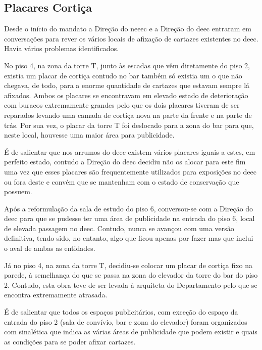 
\subsection{Placares Cortiça}

Desde o início do mandato a Direção do \acrshort{neeec} e a Direção do \acrshort{deec} entraram em conversações para rever os vários locais de afixação de cartazes existentes no \acrshort{deec}. Havia vários problemas identificados.

No piso 4, na zona da torre T, junto às escadas que vêm diretamente do piso 2, existia um placar de cortiça contudo no bar também só existia um o que não chegava, de todo, para a enorme quantidade de cartazes que estavam sempre lá afixados. Ambos os placares se encontravam em elevado estado de deterioração com buracos extremamente grandes pelo que os dois placares tiveram de ser reparados levando uma camada de cortiça nova na parte da frente e na parte de trás. Por sua vez, o placar da torre T foi deslocado para a zona do bar para que, neste local, houvesse uma maior área para publicidade.

É de salientar que nos arrumos do \acrshort{deec} existem vários placares iguais a estes, em perfeito estado, contudo a Direção do \acrshort{deec} decidiu não os alocar para este fim uma vez que esses placares são frequentemente utilizados para exposições no \acrshort{deec} ou fora deste e convém que se mantenham com o estado de conservação que possuem.

Após a reformulação da sala de estudo do piso 6, conversou-se com a Direção do \acrshort{deec} para que se pudesse ter uma área de publicidade na entrada do piso 6, local de elevada passagem no \acrshort{deec}. Contudo, nunca se avançou com uma versão definitiva, tendo sido, no entanto, algo que ficou apenas por fazer mas que inclui o aval de ambas as entidades.

Já no piso 4, na zona da torre T, decidiu-se colocar um placar de cortiça fixo na parede, à semelhança do que se passa na zona do elevador da torre do bar do piso 2. Contudo, esta obra teve de ser levada à arquiteta do Departamento pelo que se encontra extremamente atrasada.

É de salientar que todos os espaços publicitários, com exceção do espaço da entrada do piso 2 (sala de convívio, bar e zona do elevador) foram organizados com sinalética que indica as várias áreas de publicidade que podem existir e quais as condições para se poder afixar cartazes.
